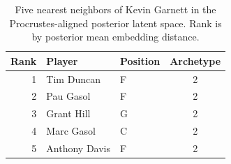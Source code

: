 \begin{table}[htbp]
  \centering\small
  \begin{tabular}{rllc}
    \toprule
    Rank & Player & Position & Archetype \\
    \midrule
    1 & Tim Duncan & F & 2 \\
    2 & Pau Gasol & F & 2 \\
    3 & Grant Hill & G & 2 \\
    4 & Marc Gasol & C & 2 \\
    5 & Anthony Davis & F & 2 \\
    \bottomrule
  \end{tabular}
  \caption{Five nearest neighbors of Kevin Garnett in the Procrustes-aligned posterior latent space. Rank is by posterior mean embedding distance.}
\end{table}

